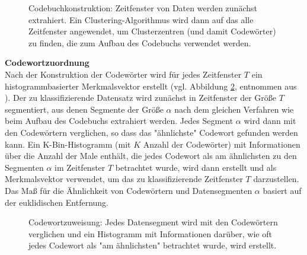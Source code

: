 \begin{figure}[h]
\caption[Codebuchkonstruktion]{Codebuchkonstruktion: Zeitfenster von Daten werden zunächst extrahiert. Ein Clustering-Algorithmus wird dann auf das alle Zeitfenster angewendet, um Clusterzentren (und damit Codewörter) zu finden, die zum Aufbau des Codebuchs verwendet werden. }
\label{fig:ca_construction} \end{figure} \vspace{0.5cm}


\textbf{Codewortzuordnung \\}
Nach der Konstruktion der Codewörter wird für jedes Zeitfenster $T$ ein histogrammbasierter Merkmalsvektor erstellt (vgl. Abbildung \ref{fig:ca_assignment}, entnommen aus \cite{kimiaki_codebook_approach_2016}). 
Der zu klassifizierende Datensatz wird zunächst in Zeitfenster der Größe $T$ segmentiert, aus denen Segmente der Größe $\alpha$ nach dem gleichen Verfahren wie beim Aufbau des Codebuchs extrahiert werden. 
Jedes Segment $\alpha$ wird dann mit den Codewörtern verglichen, so dass das "ähnlichste" Codewort gefunden werden kann. 
Ein K-Bin-Histogramm (mit $K$ Anzahl der Codewörter) mit Informationen über die Anzahl der Male enthält, die jedes Codewort als am ähnlichsten zu den Segmenten $\alpha$ im Zeitfenster $T$ betrachtet wurde, wird dann erstellt und als Merkmalsvektor verwendet, um das zu klassifizierende Zeitfenster $T$ darzustellen. 
Das Maß für die Ähnlichkeit von Codewörtern und Datensegmenten $\alpha$ basiert auf der euklidischen Entfernung. \\


\begin{figure}[h]
\caption[Codewortzuweisung]{Codewortzuweisung: Jedes Datensegment wird mit den Codewörtern verglichen und ein Histogramm mit Informationen darüber, wie oft jedes Codewort als "am ähnlichsten" betrachtet wurde, wird erstellt. }
\label{fig:ca_assignment} \end{figure} \vspace{0.5cm}


